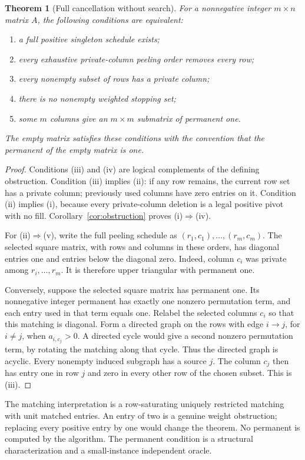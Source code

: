 \documentclass[11pt]{article}
\newtheorem{theorem}{Theorem}[section]
\theoremstyle{definition}\newtheorem{definition}[theorem]{Definition}
\theoremstyle{remark}\newtheorem{remark}[theorem]{Remark}
\begin{document}
\begin{theorem}[Full cancellation without search]
\label{thm:complete}
For a nonnegative integer $m\times n$ matrix $A$, the following conditions are equivalent:
\begin{enumerate}[label=(\roman*)]
\item a full positive singleton schedule exists;
\item every exhaustive private-column peeling order removes every row;
\item every nonempty subset of rows has a private column;
\item there is no nonempty weighted stopping set;
\item some $m$ columns give an $m\times m$ submatrix of permanent one.
\end{enumerate}
The empty matrix satisfies these conditions with the convention that the permanent of the empty matrix is one.
\end{theorem}
\begin{proof}
Conditions (iii) and (iv) are logical complements of the defining obstruction. Condition (iii) implies (ii): if any row remains, the current row set has a private column; previously used columns have zero entries on it. Condition (ii) implies (i), because every private-column deletion is a legal positive pivot with no fill. Corollary~\ref{cor:obstruction} proves (i)$\Rightarrow$(iv).

For (ii)$\Rightarrow$(v), write the full peeling schedule as $(r_1,c_1),\ldots,(r_m,c_m)$. The selected square matrix, with rows and columns in these orders, has diagonal entries one and entries below the diagonal zero. Indeed, column $c_i$ was private among $r_i,\ldots,r_m$. It is therefore upper triangular with permanent one.

Conversely, suppose the selected square matrix has permanent one. Its nonnegative integer permanent has exactly one nonzero permutation term, and each entry used in that term equals one. Relabel the selected columns $c_i$ so that this matching is diagonal. Form a directed graph on the rows with edge $i\to j$, for $i\ne j$, when $a_{i,c_j}>0$. A directed cycle would give a second nonzero permutation term, by rotating the matching along that cycle. Thus the directed graph is acyclic. Every nonempty induced subgraph has a source $j$. The column $c_j$ then has entry one in row $j$ and zero in every other row of the chosen subset. This is (iii).
\end{proof}

The matching interpretation is a row-saturating uniquely restricted matching with unit matched entries. An entry of two is a genuine weight obstruction; replacing every positive entry by one would change the theorem. No permanent is computed by the algorithm. The permanent condition is a structural characterization and a small-instance independent oracle.
\end{document}
